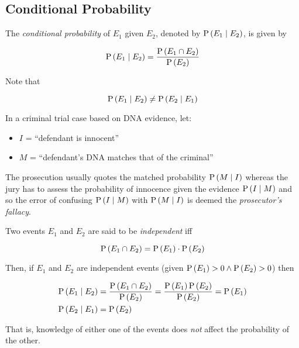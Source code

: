 \subsection{Conditional Probability}

\begin{definition}
    The \textit{conditional probability} of $E_1$ given $E_2$, denoted by $\mathrm{P} \left( E_1 \mid E_2 \right)$, is given by
    
    \begin{equation}
        \mathrm{P} \left( E_1 \mid E_2 \right) = \frac{\mathrm{P} \left( E_1 \cap E_2 \right)}{\mathrm{P} \left( E_2 \right)}
    \end{equation}
    
    Note that
    
    \begin{equation}
        \mathrm{P} \left( E_1 \mid E_2 \right) \ne \mathrm{P} \left( E_2 \mid E_1 \right)
    \end{equation}
\end{definition}

\begin{example}
    In a criminal trial case based on DNA evidence, let:
    \begin{itemize}
        \item $I$ = \enquote{defendant is innocent}
        \item $M$ = \enquote{defendant's DNA matches that of the criminal}
    \end{itemize}
    
    The prosecution usually quotes the matched probability $\mathrm{P} \left( M \mid I \right)$ whereas the jury has to assess the probability of innocence given the evidence $\mathrm{P} \left( I \mid M \right)$ and so the error of confusing $\mathrm{P} \left( I \mid M \right)$ with $\mathrm{P} \left( M \mid I \right)$ is deemed the \textit{prosecutor's fallacy}.
\end{example}

\begin{definition}[Independence]
    Two events $E_1$ and $E_2$ are said to be \textit{independent} iff
    
    \begin{equation}
        \mathrm{P} \left( E_1 \cap E_2 \right) = \mathrm{P} \left( E_1 \right) \cdot \mathrm{P} \left( E_2 \right)
    \end{equation}
    
    Then, if $E_1$ and $E_2$ are independent events (given $\mathrm{P} \left( E_1 \right) > 0 \land \mathrm{P} \left( E_2 \right) > 0$) then
    
    \begin{align}
        \mathrm{P} \left( E_1 \mid E_2 \right) &= \frac{\mathrm{P} \left( E_1 \cap E_2 \right)}{\mathrm{P} \left( E_2 \right)} = \frac{\mathrm{P} \left( E_1 \right)\mathrm{P} \left( E_2 \right)}{\mathrm{P} \left( E_2 \right)} = \mathrm{P} \left( E_1 \right) \\
        \mathrm{P} \left( E_2 \mid E_1 \right) &= \mathrm{P} \left( E_2 \right)
    \end{align}
    
    That is, knowledge of either one of the events does \textit{not} affect the probability of the other.
\end{definition}

